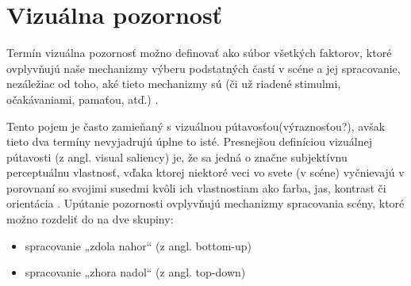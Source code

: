 \newpage

\section{Vizuálna pozornosť}
\label{saliency}
	
Termín vizuálna pozornosť možno definovať ako súbor všetkých faktorov, ktoré ovplyvňujú naše mechanizmy výberu podstatných častí v scéne a jej spracovanie, nezáležiac od toho, aké tieto mechanizmy sú (či už riadené stimulmi, očakávaniami, pamaťou, atď.) \cite{borji2013state}.

Tento pojem je často zamieňaný s vizuálnou pútavosťou(výraznosťou?), avšak tieto dva termíny nevyjadrujú úplne to isté. Presnejšou definíciou vizuálnej pútavosti (z angl. visual saliency) je, že sa jedná o značne subjektívnu perceptuálnu vlastnosť, vďaka ktorej niektoré veci vo svete (v scéne) vyčnievajú v porovnaní so svojimi susedmi kvôli ich vlastnostiam ako farba, jas, kontrast či orientácia \cite{itti2007visual}. Upútanie pozornosti ovplyvňujú mechanizmy spracovania scény, ktoré možno rozdeliť do na dve skupiny:
\begin{itemize}
	\item spracovanie „zdola nahor“ (z angl. bottom-up) %
	\item spracovanie „zhora nadol“ (z angl. top-down) %
	
\end{itemize}


